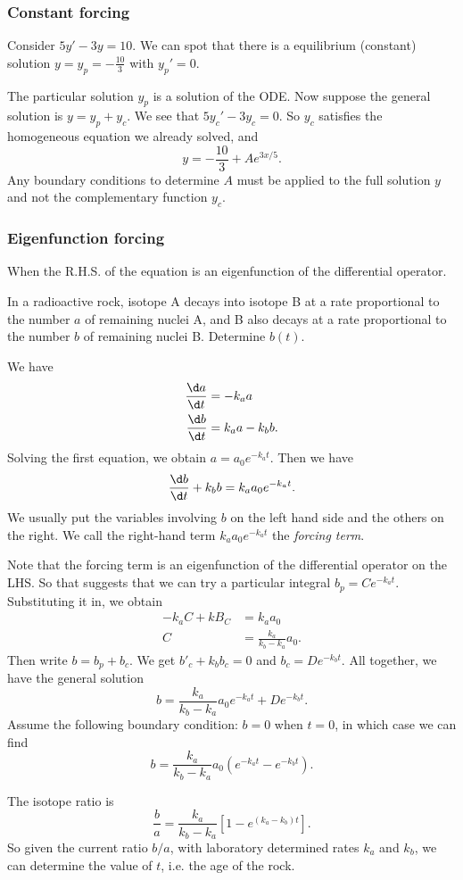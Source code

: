\documentclass[a4paper]{article}
\begin{document}
\subsubsection{Constant forcing}
\begin{eg}
  Consider $5y' - 3y = 10$. We can spot that there is a equilibrium (constant) solution $y = y_p = -\frac{10}{3}$ with $y_p' = 0$.
  
  The particular solution $y_p$ is a solution of the ODE. Now suppose the general solution is $y = y_p + y_c$. We see that $5y_c' - 3y_c = 0$. So $y_c$ satisfies the homogeneous equation we already solved, and
  \[
  y = -\frac{10}{3} + Ae^{3x/5}.
  \]
  \note Any boundary conditions to determine $A$ must be applied to the full solution $y$ and not the complementary function $y_c$. 
\end{eg}
\subsubsection{Eigenfunction forcing}
When the R.H.S. of the equation is an eigenfunction of the differential operator.
\begin{eg}
  In a radioactive rock, isotope A decays into isotope B at a rate proportional to the number $a$ of remaining nuclei A, and B also decays at a rate proportional to the number $b$ of remaining nuclei B. Determine $b(t)$.

  We have
  \begin{align*}
    \frac{\d a}{\d t} &= -k_a a\\
    \frac{\d b}{\d t} &= k_a a - k_b b.
  \end{align*}
  Solving the first equation, we obtain $a = a_0e^{-k_at}$. Then we have
  \[
  \frac{\d b}{\d t} + k_b b = k_aa_0e^{-k_at}.
  \]
  We usually put the variables involving $b$ on the left hand side and the others on the right. We call the right-hand term $k_aa_0e^{-k_at}$ the \emph{forcing term}.

  Note that the forcing term is an eigenfunction of the differential operator on the LHS. So that suggests that we can try a particular integral $b_p = Ce^{-k_at}$. Substituting it in, we obtain
  \begin{align*}
    -k_aC + kB_C &= k_a a_0\\
    C &= \frac{k_a}{k_b - k_a}a_0.
  \end{align*}
  Then write $b = b_p + b_c$. We get $b'_c + k_bb_c = 0$ and $b_c = De^{-k_bt}$. All together, we have the general solution
  \[
  b = \frac{k_a}{k_b - k_a}a_0 e^{-k_at} + De^{-k_bt}.
  \]
  Assume the following boundary condition: $b = 0$ when $t = 0$, in which case we can find 
  \[
  b = \frac{k_a}{k_b - k_a}a_0\left(e^{-k_at} - e^{-k_bt}\right).
  \]

  The isotope ratio is
  \[
  \frac{b}{a} = \frac{k_a}{k_b - k_a}\left[1 - e^{(k_a - k_b)t}\right].
  \]
  So given the current ratio $b/a$, with laboratory determined rates $k_a$ and $k_b$, we can determine the value of $t$, i.e. the age of the rock.
\end{eg}
\end{document}

